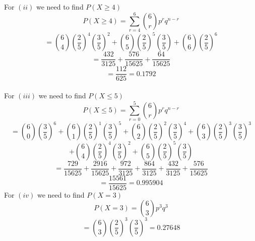 \documentclass[journal,12pt,twocolumn]{IEEEtran}
\begin{document}
For \((ii)\) we need to find \(P(X \geq 4)\)
\[P(X \geq 4)  = \sum_{r = 4}^6 {6 \choose r} p^r q^{n-r}\]
\[= {6 \choose 4} \left(\frac{2}{5} \right)^4 \left(\frac{3}{5} \right)^2 + {6 \choose 5} \left(\frac{2}{5} \right)^5 \left(\frac{3}{5} \right) + {6 \choose 6} \left(\frac{2}{5} \right)^6  \]
\[=\frac{432}{3125} + \frac{576}{15625} + \frac{64}{15625}\]
\[= \frac{112}{625} = 0.1792\]
\\
For \((iii)\) we need to find \(P(X \leq 5)\)
\[P(X \leq 5) = \sum_{r = 0}^5 {6 \choose r} p^r q^{n - r}\]
\[= {6 \choose 0} \left(\frac{3}{5} \right)^6 + {6 \choose 1} \left(\frac{2}{5} \right)^1 \left(\frac{3}{5} \right)^5 + {6 \choose 2} \left(\frac{2}{5} \right)^2 \left(\frac{3}{5} \right)^4 +{6 \choose 3} \left(\frac{2}{5} \right)^3 \left(\frac{3}{5} \right)^3\]\[ + {6 \choose 4} \left(\frac{2}{5} \right)^4 \left(\frac{3}{5} \right)^2 + {6 \choose 5} \left(\frac{2}{5} \right)^5 \left(\frac{3}{5} \right)\]
\[= \frac{729}{15625} + \frac{2916}{15625} + \frac{972}{3125} + \frac{864}{3125} + \frac{432}{3125} + \frac{576}{15625}\]
\[= \frac{15561}{15625} = 0.995904\]
For \((iv)\) we need to find \(P(X = 3)\)
\[P(X = 3) = {6 \choose 3} p^3 q^3\]
\[={6 \choose 3} \left(\frac{2}{5} \right)^3 \left(\frac{3}{5} \right)^3 = 0.27648\]
\end{document}
